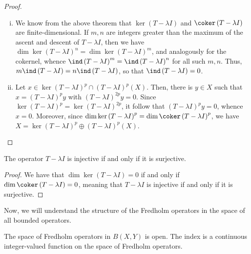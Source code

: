 \documentclass[10pt]{mypackage}
\begin{document}
\begin{proof}\hfill
  \begin{enumerate}[(i)]
    \item We know from the above theorem that $\ker\left( T-\lambda I \right)$ and $\coker\left( T-\lambda I \right)$ are finite-dimensional. If $m,n$ are integers greater than the maximum of the ascent and descent of $T-\lambda I$, then we have $\dim\ker\left( T - \lambda I \right)^{n} = \dim\ker\left( T-\lambda I \right)^{m}$, and analogously for the cokernel, whence $\ind\left( T-\lambda I \right)^{m} = \ind\left( T-\lambda I \right)^{n}$ for all such $m,n$. Thus, $m\ind\left( T-\lambda I \right) = n\ind\left( T-\lambda I \right)$, so that $\ind\left( T-\lambda I \right) = 0$.
    \item Let $x\in \ker\left( T-\lambda I \right)^{p}\cap \left( T-\lambda I \right)^{p}(X)$. Then, there is $y\in X$ such that $x = \left( T-\lambda I \right)^{p} y$ with $\left( T-\lambda I \right)^{2p} y = 0$. Since $\ker\left( T-\lambda I \right)^{p} = \ker\left( T-\lambda I \right)^{2p}$, it follow that $\left( T-\lambda I \right)^{p} y = 0$, whence $x= 0$. Moreover, since $\dim\ker\left( T-\lambda I \right)^{p} = \dim\coker\left( T-\lambda I \right)^{p}$, we have $X = \ker\left( T-\lambda I \right)^{p}\oplus \left( T-\lambda I \right)^{p}(X)$.
  \end{enumerate}
\end{proof}
\begin{corollary}
  The operator $T-\lambda I$ is injective if and only if it is surjective.
\end{corollary}
\begin{proof}
  We have that $\dim\ker\left( T-\lambda I \right) = 0$ if and only if $\dim\coker\left( T-\lambda I \right) = 0$, meaning that $T-\lambda I$ is injective if and only if it is surjective.
\end{proof}
Now, we will understand the structure of the Fredholm operators in the space of all bounded operators.
\begin{proposition}
  The space of Fredholm operators in $B\left( X,Y \right)$ is open. The index is a continuous integer-valued function on the space of Fredholm operators.
\end{proposition}
\end{document}
